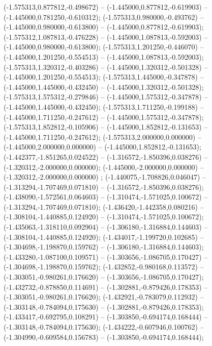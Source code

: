  (-1.575313,0.877812,-0.498672) -- (-1.445000,0.877812,-0.619903) -- (-1.445000,0.781250,-0.610312);
 (-1.575313,0.980000,-0.493762) -- (-1.445000,0.980000,-0.613800) -- (-1.445000,0.877812,-0.619903);
 (-1.575312,1.087813,-0.476228) -- (-1.445000,1.087813,-0.592003) -- (-1.445000,0.980000,-0.613800);
 (-1.575313,1.201250,-0.446070) -- (-1.445000,1.201250,-0.554513) -- (-1.445000,1.087813,-0.592003);
 (-1.575313,1.320312,-0.403286) -- (-1.445000,1.320312,-0.501328) -- (-1.445000,1.201250,-0.554513);
 (-1.575313,1.445000,-0.347878) -- (-1.445000,1.445000,-0.432450) -- (-1.445000,1.320312,-0.501328);
 (-1.575313,1.575312,-0.279846) -- (-1.445000,1.575312,-0.347878) -- (-1.445000,1.445000,-0.432450);
 (-1.575313,1.711250,-0.199188) -- (-1.445000,1.711250,-0.247612) -- (-1.445000,1.575312,-0.347878);
 (-1.575313,1.852812,-0.105906) -- (-1.445000,1.852812,-0.131653) -- (-1.445000,1.711250,-0.247612);
 (-1.575313,2.000000,0.000000) -- (-1.445000,2.000000,0.000000) -- (-1.445000,1.852812,-0.131653);
 (-1.442377,-1.851265,0.024522) -- (-1.316572,-1.850396,0.038276) -- (-1.320312,-2.000000,0.000000);
 (-1.445000,-2.000000,0.000000) -- (-1.320312,-2.000000,0.000000) ;
 (-1.440075,-1.708826,0.046047) -- (-1.313294,-1.707469,0.071810) -- (-1.316572,-1.850396,0.038276);
 (-1.438090,-1.572561,0.064603) -- (-1.310474,-1.571025,0.100672) -- (-1.313294,-1.707469,0.071810);
 (-1.436420,-1.442358,0.080216) -- (-1.308104,-1.440885,0.124920) -- (-1.310474,-1.571025,0.100672);
 (-1.435063,-1.318110,0.092904) -- (-1.306180,-1.316884,0.144603) -- (-1.308104,-1.440885,0.124920);
 (-1.434017,-1.199720,0.102685) -- (-1.304698,-1.198870,0.159762) -- (-1.306180,-1.316884,0.144603);
 (-1.433280,-1.087100,0.109571) -- (-1.303656,-1.086705,0.170427) -- (-1.304698,-1.198870,0.159762);
 (-1.432852,-0.980168,0.113572) -- (-1.303051,-0.980261,0.176620) -- (-1.303656,-1.086705,0.170427);
 (-1.432732,-0.878850,0.114691) -- (-1.302881,-0.879426,0.178353) -- (-1.303051,-0.980261,0.176620);
 (-1.432921,-0.783079,0.112932) -- (-1.303148,-0.784094,0.175630) -- (-1.302881,-0.879426,0.178353);
 (-1.433417,-0.692795,0.108291) -- (-1.303850,-0.694174,0.168444) -- (-1.303148,-0.784094,0.175630);
 (-1.434222,-0.607946,0.100762) -- (-1.304990,-0.609584,0.156783) -- (-1.303850,-0.694174,0.168444);
